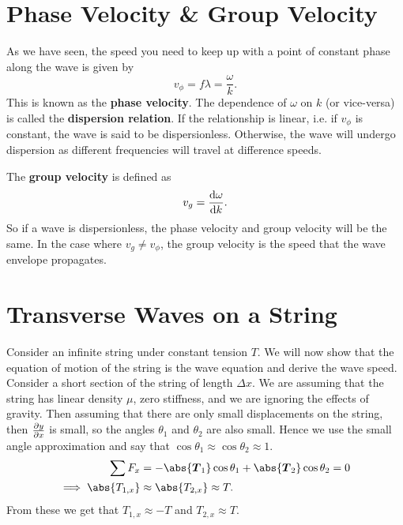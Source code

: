 \documentclass[../classical_mechanics.tex]{subfiles}
\begin{document}
    \section{Phase Velocity \& Group Velocity}\label{sec:phase-velocity-and-group-velocity}
        As we have seen, the speed you need to keep up with a point of constant phase along the wave is given by
        \begin{equation}
            v_\phi=f\lambda=\frac{\omega}{k}.
        \end{equation}
        This is known as the \textbf{phase velocity}.
        The dependence of $\omega$ on $k$ (or vice-versa) is called the \textbf{dispersion relation}.
        If the relationship is linear, i.e. if $v_\phi$ is constant, the wave is said to be dispersionless.
        Otherwise, the wave will undergo dispersion as different frequencies will travel at difference speeds.

        The \textbf{group velocity} is defined as
        \begin{equation}
            v_g=\dv{\omega}{k}.
        \end{equation}
        So if a wave is dispersionless, the phase velocity and group velocity will be the same.
        In the case where $v_g\neq v_\phi$, the group velocity is the speed that the wave envelope propagates.

    \section{Transverse Waves on a String}\label{sec:transverse-waves-on-a-string}
        Consider an infinite string under constant tension $T$.
        We will now show that the equation of motion of the string is the wave equation and derive the wave speed.
        Consider a short section of the string of length $\Delta x$.
        We are assuming that the string has linear density $\mu$, zero stiffness, and we are ignoring the effects of gravity.
        Then assuming that there are only small displacements on the string, then $\pdv{y}{x}$ is small, so the angles $\theta_1$ and $\theta_2$ are also small.
        Hence we use the small angle approximation and say that $\cos\theta_1\approx\cos\theta_2\approx 1$.
        \begin{align}
            \sum F_x&=-\abs{\vec{T}_1}\cos\theta_1+\abs{\vec{T}_2}\cos\theta_2=0\\
            \implies\abs{T_{1,x}}&\approx\abs{T_{2,x}}\approx T.
        \end{align}
        From these we get that $T_{1,x}\approx -T$ and $T_{2,x}\approx T$.
        
\end{document}
